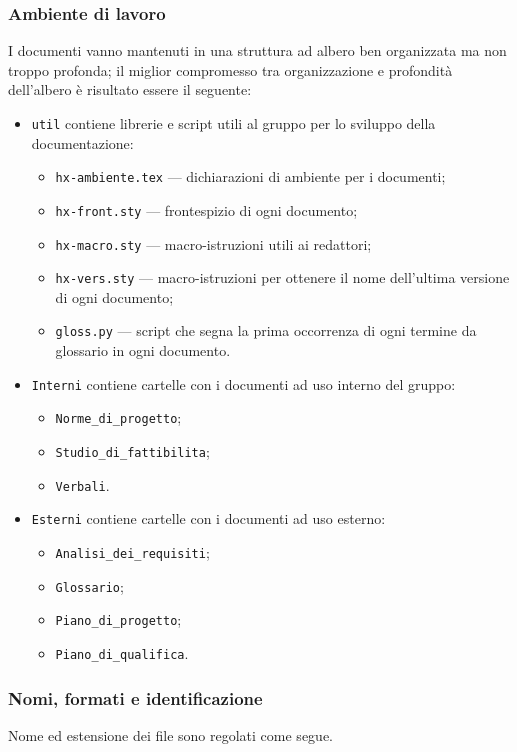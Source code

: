 \subsubsection{Ambiente di lavoro} I documenti vanno mantenuti in una struttura ad albero ben organizzata ma non troppo profonda; il miglior compromesso tra organizzazione e profondità dell'albero è risultato essere il seguente:
\begin{itemize}
	\item \texttt{util} contiene librerie e script utili al gruppo per lo sviluppo della documentazione:
	\begin{itemize}
		\item \texttt{hx-ambiente.tex} --- dichiarazioni di ambiente per i documenti;
		\item \texttt{hx-front.sty} --- frontespizio di ogni documento;
		\item \texttt{hx-macro.sty} --- macro-istruzioni utili ai redattori;
		\item \texttt{hx-vers.sty} --- macro-istruzioni per ottenere il nome dell'ultima versione di ogni documento;
		\item \texttt{gloss.py} --- script che segna la prima occorrenza di ogni termine da glossario in ogni documento.
	\end{itemize}
	\item \texttt{Interni} contiene cartelle con i documenti ad uso interno del gruppo:
	\begin{itemize}
		\item \texttt{Norme_di_progetto};
		\item \texttt{Studio_di_fattibilita};
		\item \texttt{Verbali}.
	\end{itemize}
	\item \texttt{Esterni} contiene cartelle con i documenti ad uso esterno:
	\begin{itemize}
		\item \texttt{Analisi_dei_requisiti};
		\item \texttt{Glossario};
		\item \texttt{Piano_di_progetto};
		\item \texttt{Piano_di_qualifica}.
	\end{itemize}
\end{itemize}

\subsubsection{Nomi, formati e identificazione} Nome ed estensione dei file sono regolati come segue.
